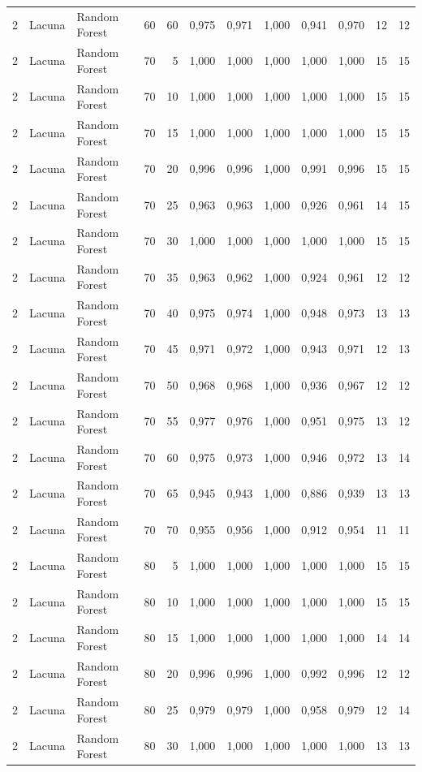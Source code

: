 \begin{longtable}{@{}rllrrrrrrrrr@{}}
2 & Lacuna & Random Forest & 60 & 60 & 0,975 & 0,971 & 1,000 & 0,941 & 0,970 & 12 & 12 \\
2 & Lacuna & Random Forest & 70 & 5 & 1,000 & 1,000 & 1,000 & 1,000 & 1,000 & 15 & 15 \\
2 & Lacuna & Random Forest & 70 & 10 & 1,000 & 1,000 & 1,000 & 1,000 & 1,000 & 15 & 15 \\
2 & Lacuna & Random Forest & 70 & 15 & 1,000 & 1,000 & 1,000 & 1,000 & 1,000 & 15 & 15 \\
2 & Lacuna & Random Forest & 70 & 20 & 0,996 & 0,996 & 1,000 & 0,991 & 0,996 & 15 & 15 \\
2 & Lacuna & Random Forest & 70 & 25 & 0,963 & 0,963 & 1,000 & 0,926 & 0,961 & 14 & 15 \\
2 & Lacuna & Random Forest & 70 & 30 & 1,000 & 1,000 & 1,000 & 1,000 & 1,000 & 15 & 15 \\
2 & Lacuna & Random Forest & 70 & 35 & 0,963 & 0,962 & 1,000 & 0,924 & 0,961 & 12 & 12 \\
2 & Lacuna & Random Forest & 70 & 40 & 0,975 & 0,974 & 1,000 & 0,948 & 0,973 & 13 & 13 \\
2 & Lacuna & Random Forest & 70 & 45 & 0,971 & 0,972 & 1,000 & 0,943 & 0,971 & 12 & 13 \\
2 & Lacuna & Random Forest & 70 & 50 & 0,968 & 0,968 & 1,000 & 0,936 & 0,967 & 12 & 12 \\
2 & Lacuna & Random Forest & 70 & 55 & 0,977 & 0,976 & 1,000 & 0,951 & 0,975 & 13 & 12 \\
2 & Lacuna & Random Forest & 70 & 60 & 0,975 & 0,973 & 1,000 & 0,946 & 0,972 & 13 & 14 \\
2 & Lacuna & Random Forest & 70 & 65 & 0,945 & 0,943 & 1,000 & 0,886 & 0,939 & 13 & 13 \\
2 & Lacuna & Random Forest & 70 & 70 & 0,955 & 0,956 & 1,000 & 0,912 & 0,954 & 11 & 11 \\
2 & Lacuna & Random Forest & 80 & 5 & 1,000 & 1,000 & 1,000 & 1,000 & 1,000 & 15 & 15 \\
2 & Lacuna & Random Forest & 80 & 10 & 1,000 & 1,000 & 1,000 & 1,000 & 1,000 & 15 & 15 \\
2 & Lacuna & Random Forest & 80 & 15 & 1,000 & 1,000 & 1,000 & 1,000 & 1,000 & 14 & 14 \\
2 & Lacuna & Random Forest & 80 & 20 & 0,996 & 0,996 & 1,000 & 0,992 & 0,996 & 12 & 12 \\
2 & Lacuna & Random Forest & 80 & 25 & 0,979 & 0,979 & 1,000 & 0,958 & 0,979 & 12 & 14 \\
2 & Lacuna & Random Forest & 80 & 30 & 1,000 & 1,000 & 1,000 & 1,000 & 1,000 & 13 & 13 \\

\end{longtable}
